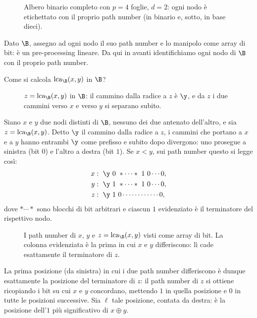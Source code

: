 \begin{figure}[H]
  \centering
  
  \caption{Albero binario completo con $p=4$ foglie, $d=2$: ogni nodo è etichettato con
    il proprio path number (in binario e, sotto, in base dieci).}
  \label{fig:lca-b-path-number}
\end{figure}

Dato $\B$, assegno ad ogni nodo il suo path number e lo manipolo come array di bit: è
un pre-processing lineare. Da qui in avanti identifichiamo ogni nodo di $\B$ con il
proprio path number.

\begin{domanda}
  Come si calcola $\lca_{\B}(x,y)$ in $\B$?
\end{domanda}

\begin{figure}[H]
  \centering
  
  \caption{$z=\lca_{\B}(x,y)$ in $\B$: il cammino dalla radice a $z$ è $\y$, e da $z$ i
    due cammini verso $x$ e verso $y$ si separano subito.}
  \label{fig:lca-b-triangolo}
\end{figure}

Siano $x$ e $y$ due nodi distinti di $\B$, nessuno dei due antenato dell'altro, e sia
$z=\lca_{\B}(x,y)$. Detto $\y$ il cammino dalla radice a $z$, i cammini che portano a
$x$ e a $y$ hanno entrambi $\y$ come prefisso e subito dopo divergono: uno prosegue a
sinistra (bit $0$) e l'altro a destra (bit $1$). Se $x<y$, sui path number questo si
legge così:
\[
  \begin{aligned}
    x &: \ \y\ 0\ \ast\cdots\ast\ 1\ 0\cdots 0,\\
    y &: \ \y\ 1\ \ast\cdots\ast\ 1\ 0\cdots 0,\\
    z &: \ \y\ 1\ 0\cdots\cdots\cdots\cdots 0,
  \end{aligned}
\]
dove $\ast\cdots\ast$ sono blocchi di bit arbitrari e ciascun $1$ evidenziato è il
terminatore del rispettivo nodo.

\begin{figure}[H]
  \centering
  
  \caption{I path number di $x$, $y$ e $z=\lca_{\B}(x,y)$ visti come array di bit. La
    colonna evidenziata è la prima in cui $x$ e $y$ differiscono: lì cade esattamente
    il terminatore di $z$.}
  \label{fig:lca-b-array-bit}
\end{figure}

La prima posizione (da sinistra) in cui i due path number differiscono è dunque
esattamente la posizione del terminatore di $z$: il path number di $z$ si ottiene
ricopiando i bit su cui $x$ e $y$ concordano, mettendo $1$ in quella posizione e $0$ in
tutte le posizioni successive. Sia $\ell$ tale posizione, contata da destra: è la
posizione dell'$1$ più significativo di $x \oplus y$.

